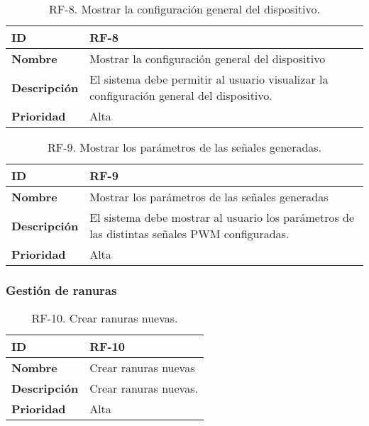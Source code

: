 \begin{table}[h!]
    \centering
    \caption{RF-8. Mostrar la configuración general del dispositivo.}
    \begin{tabular}{|m{2.5cm}|m{9.27cm}|}
        \hline
        \textbf{ID} & RF-8 \\
        \hline
        \textbf{Nombre} & Mostrar la configuración general del dispositivo \\
        \hline
        \textbf{Descripción} & El sistema debe permitir al usuario visualizar la configuración general del dispositivo. \\
        \hline
        \textbf{Prioridad} & Alta \\
        \hline
    \end{tabular}
\end{table}

\begin{table}[h!]
    \centering
    \caption{RF-9. Mostrar los parámetros de las señales generadas.}
    \begin{tabular}{|m{2.5cm}|m{9.27cm}|}
        \hline
        \textbf{ID} & RF-9 \\
        \hline
        \textbf{Nombre} & Mostrar los parámetros de las señales generadas \\
        \hline
        \textbf{Descripción} & El sistema debe mostrar al usuario los parámetros de las distintas señales PWM configuradas. \\
        \hline
        \textbf{Prioridad} & Alta \\
        \hline
    \end{tabular}
\end{table}

\subsubsection{Gestión de ranuras}

\begin{table}[h!]
    \centering
    \caption{RF-10. Crear ranuras nuevas.}
    \begin{tabular}{|m{2.5cm}|m{9.27cm}|}
        \hline
        \textbf{ID} & RF-10 \\
        \hline
        \textbf{Nombre} & Crear ranuras nuevas \\
        \hline
        \textbf{Descripción} & Crear ranuras nuevas. \\
        \hline
        \textbf{Prioridad} & Alta \\
        \hline
    \end{tabular}
\end{table}

